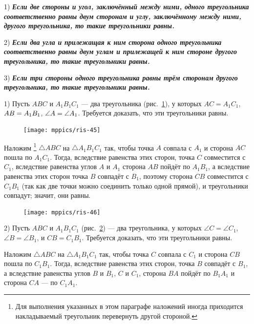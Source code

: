 \documentclass[twoside]{book}
\begin{document}
1) \textbf{\emph{Если две стороны и угол, заключённый
между ними, одного треугольника соответственно равны
двум сторонам и углу, заключённому между ними, другого треугольника, то такие треугольники равны.}}

2) \textbf{\emph{Если два угла и прилежащая к ним сторона одного треугольника соответственно равны двум углам и прилежащей к ним стороне другого треугольника, то такие треугольники равны.}}

3) \textbf{\emph{Если три стороны одного треугольника равны трём сторонам другого треугольника, то такие треугольники равны.}}


1) Пусть $ABC$ и $A_1B_1C_1$ — два треугольника (рис.~\ref{1938/ris-45}), у которых
$AC=A_1C_1$, $AB \z= A_1B_1$, $\angle A \z= \angle A_1$.
Требуется доказать, что эти треугольники равны.

\begin{figure}
\vskip-4mm
\centering
\texttt{[image: mppics/ris-45]}
\caption{}\label{1938/ris-45}
\end{figure}

Наложим%
\footnote{Для выполнения указанных в этом параграфе наложений иногда приходится накладываемый треугольник перевернуть другой стороной.} 
$\triangle ABC$ на $\triangle A_1B_1C_1$ так, чтобы точка $A$ совпала с $A_1$ и сторона $AC$ пошла по $A_1C_1$.
Тогда, вследствие равенства этих сторон, точка $C$ совместится с $C_1$, вследствие равенства углов $A$ и $A_1$ сторона $AB$ пойдёт по $A_1B_1$, а вследствие равенства этих сторон точка $B$ совпадёт с $B_1$, поэтому сторона $CB$ совместится с $C_1B_1$ (так как две точки можно соединить только одной прямой), и треугольники совпадут;
значит, они равны.



\begin{figure}
\centering
\texttt{[image: mppics/ris-46]}
\caption{}\label{1938/ris-46}
\end{figure}

2) Пусть $ABC$ и $A_1B_1C_1$ (рис.~\ref{1938/ris-46}) — два треугольника, у которых $\angle C= \angle C_1$,
$\angle B=\angle B_1$,
и
$CB = C_1B_1$.
Требуется доказать, что эти треугольники равны.

Наложим $\triangle ABC$ на $\triangle A_1B_1C_1$ так, чтобы точка $C$ совпала с $C_1$ и сторона $CB$ пошла по $C_1B_1$.
Тогда, вследствие равенства этих сторон, точка $B$ совпадёт с $B_1$, а вследствие равенства углов $B$ и $B_1$, $C$ и $C_1$, сторона $BA$ пойдёт по $B_1A_1$ и сторона $CA$ — по $C_1A_1$.
\end{document}
